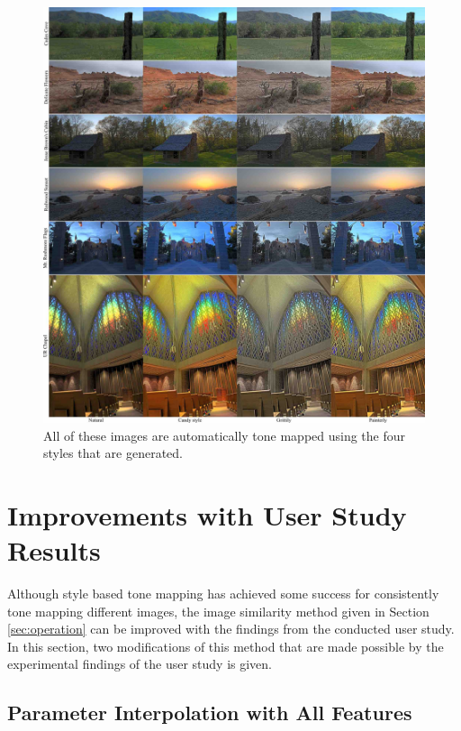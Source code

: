 \begin{figure}
\begin{center}
\includegraphics[width=\textwidth]{figures/chapter5/style_based/gallery_small.jpg}
\caption{All of these images are automatically tone mapped using the four styles that are generated.}
\label{fig:gallery}
\end{center}
\end{figure}

\section{Improvements with User Study Results}
Although style based tone mapping has achieved some success for consistently tone mapping different images, the image similarity method given in Section \ref{sec:operation} can be improved with the findings from the conducted user study. In this section, two modifications of this method that are made possible by the experimental findings of the user study is given.

\subsection{Parameter Interpolation with All Features}

